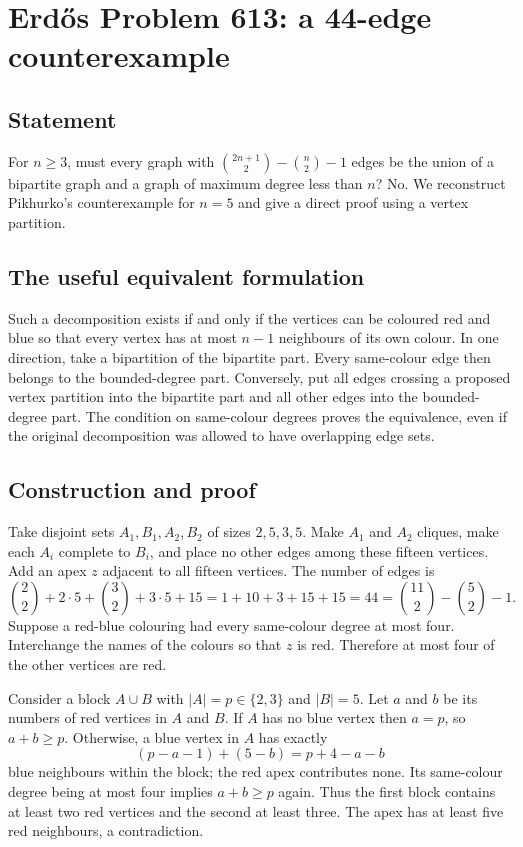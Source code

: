 \section{Erd\H{o}s Problem 613: a 44-edge counterexample}
\subsection*{Statement}
For $n\ge3$, must every graph with
$\binom{2n+1}{2}-\binom n2-1$ edges be the union of a bipartite graph and a graph of maximum degree less than $n$? No. We reconstruct Pikhurko's counterexample for $n=5$ and give a direct proof using a vertex partition.

\subsection*{The useful equivalent formulation}
Such a decomposition exists if and only if the vertices can be coloured red and blue so that every vertex has at most $n-1$ neighbours of its own colour.
In one direction, take a bipartition of the bipartite part. Every same-colour edge then belongs to the bounded-degree part. Conversely, put all edges crossing a proposed vertex partition into the bipartite part and all other edges into the bounded-degree part. The condition on same-colour degrees proves the equivalence, even if the original decomposition was allowed to have overlapping edge sets.

\subsection*{Construction and proof}
Take disjoint sets $A_1,B_1,A_2,B_2$ of sizes $2,5,3,5$. Make $A_1$ and $A_2$ cliques, make each $A_i$ complete to $B_i$, and place no other edges among these fifteen vertices. Add an apex $z$ adjacent to all fifteen vertices. The number of edges is
\[
 \binom22+2\cdot5+\binom32+3\cdot5+15
 =1+10+3+15+15=44
 =\binom{11}{2}-\binom52-1.
\]
Suppose a red-blue colouring had every same-colour degree at most four. Interchange the names of the colours so that $z$ is red. Therefore at most four of the other vertices are red.

Consider a block $A\cup B$ with $|A|=p\in\{2,3\}$ and $|B|=5$. Let $a$ and $b$ be its numbers of red vertices in $A$ and $B$. If $A$ has no blue vertex then $a=p$, so $a+b\ge p$. Otherwise, a blue vertex in $A$ has exactly
\[
 (p-a-1)+(5-b)=p+4-a-b
\]
blue neighbours within the block; the red apex contributes none. Its same-colour degree being at most four implies $a+b\ge p$ again. Thus the first block contains at least two red vertices and the second at least three. The apex has at least five red neighbours, a contradiction.

